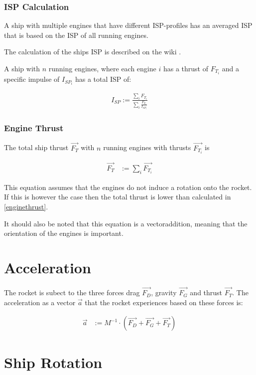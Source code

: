 \documentclass[11pt]{article}
\newcommand{\oa}[1]{\overrightarrow{#1}}
\newcommand{\F}[1]{\oa{F_{#1}}}
\begin{document}
\subsubsection{ISP Calculation}

A ship with multiple engines that have different ISP-profiles has an
averaged ISP that is based on the ISP of all running engines.

The calculation of the ships ISP is described on the wiki
\cite{MulEng}.

A ship with $n$ running engines, where each engine $i$ has a thrust of
$F_{T_i}$ and a specific impulse of $I_{SP_i}$ has a total ISP of:

\begin{align}
  I_{SP} := \frac{\sum_i{F_{T_i}}}{\sum_i{\frac{F_{T_i}}{I_{SP_i}}}}
\end{align}

\subsubsection{Engine Thrust}

The total  ship thrust $\F{T}$ with $n$ running engines
with thrusts $\F{T_i}$ is

\begin{align}
  \F{T} & := \sum_{i}\F{T_i}\label{enginethrust}
\end{align}

This equation assumes that the engines do not induce a rotation onto
the rocket. If this is however the case then the total thrust is lower
than calculated in \eqref{enginethrust}.

It should also be noted that this equation is a vectoraddition,
meaning that the orientation of the engines is important.

\section{Acceleration}

The rocket is subect to the three forces drag $\F{D}$, gravity $\F{G}$
and thrust $\F{T}$.  The  acceleration as a vector
$\oa{a}$ that the rocket experiences based on these forces is:

\begin{align}
  \oa{a} &:= M^{-1} \cdot(\F{D} + \F{G} + \F{T})
\end{align}

\section{Ship Rotation}
\end{document}
